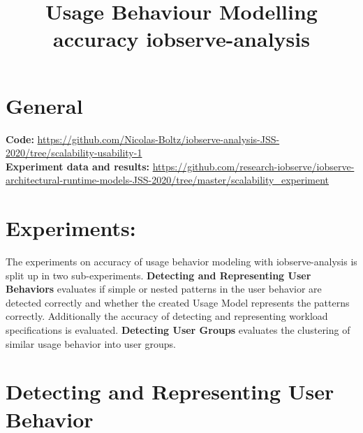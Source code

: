 \documentclass[10pt,a4paper]{article}
\begin{document}
\title{Usage Behaviour Modelling\\accuracy iobserve-analysis}
\date{}
\maketitle

	\section{General}
	\textbf{Code:} \url{https://github.com/Nicolas-Boltz/iobserve-analysis-JSS-2020/tree/scalability-usability-1}\\
	\textbf{Experiment data and results:} \url{https://github.com/research-iobserve/iobserve-architectural-runtime-models-JSS-2020/tree/master/scalability_experiment}
	
	\section{Experiments:}
	The experiments on accuracy of usage behavior modeling with iobserve-analysis is split up in two sub-experiments. \textbf{Detecting and Representing User Behaviors} evaluates if simple or nested patterns in the user behavior are detected correctly and whether the created Usage Model represents the patterns correctly. Additionally the accuracy of detecting and representing workload specifications is evaluated. \textbf{Detecting User Groups} evaluates the clustering of similar usage behavior into user groups.

	\section{Detecting and Representing User Behavior}
\end{document}
